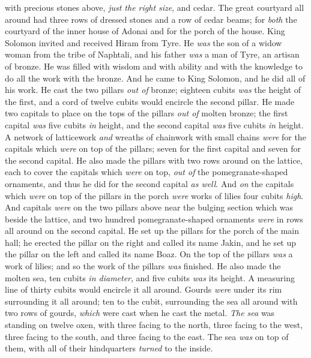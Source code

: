 \begin{biblechapter}
\verse with precious stones above, \textit{just the right size}, and cedar.
\verse The great courtyard all around had three rows of dressed stones and a row of cedar beams; for \textit{both} the courtyard of the inner house of Adonai and for the porch of the house.
\verse King Solomon invited and received Hiram from Tyre.
\verse He \textit{was} the son of a widow woman from the tribe of Naphtali, and his father \textit{was} a man of Tyre, an artisan of bronze. He was filled with wisdom and with ability and with the knowledge to do all the work with the bronze. And he came to King Solomon, and he did all of his work.
\verse He cast the two pillars \textit{out of} bronze; eighteen cubits \textit{was} the height of the first, and a cord of twelve cubits would encircle the second pillar.
\verse He made two capitals to place on the tops of the pillars \textit{out of} molten bronze; the first capital \textit{was} five cubits \textit{in} height, and the second capital \textit{was} five cubits \textit{in} height.
\verse A network of latticework \textit{and} wreaths of chainwork with small chains \textit{were} for the capitals which \textit{were} on top of the pillars; seven for the first capital and seven for the second capital.
\verse He also made the pillars with two rows around on the lattice, each to cover the capitals which \textit{were} on top, \textit{out of} the pomegranate-shaped ornaments, and thus he did for the second capital \textit{as well}.
\verse And \textit{on} the capitals which \textit{were} on top of the pillars in the porch \textit{were} works of lilies four cubits \textit{high}.
\verse And capitals \textit{were} on the two pillars above near the bulging section which was beside the lattice, and two hundred pomegranate-shaped ornaments \textit{were} in rows all around on the second capital.
\verse He set up the pillars for the porch of the main hall; he erected the pillar on the right and called its name Jakin, and he set up the pillar on the left and called its name Boaz.
\verse On the top of the pillars \textit{was} a work of lilies; and so the work of the pillars \textit{was} finished.
\verse He also made the molten sea, ten cubits \textit{in diameter}, and five cubits \textit{was} its height. A measuring line of thirty cubits would encircle it all around.
\verse Gourds \textit{were} under its rim surrounding it all around; ten to the cubit, surrounding the sea all around with two rows of gourds, \textit{which} were cast when he cast the metal.
\verse \textit{The sea} was standing on twelve oxen, with three facing to the north, three facing to the west, three facing to the south, and three facing to the east. The sea \textit{was} on top of them, with all of their hindquarters \textit{turned} to the inside.

\end{biblechapter}
